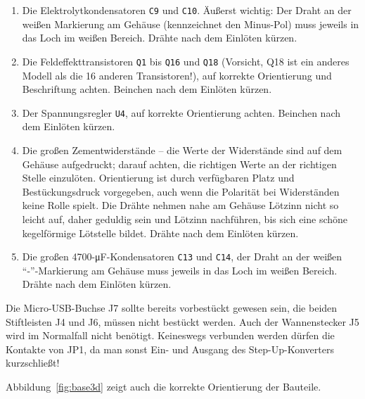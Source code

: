 \documentclass[paper=a4, open=any]{scrbook}
\begin{document}
\begin{enumerate}
					\item Die Elektrolytkondensatoren \texttt{C9} und \texttt{C10}. Äußerst wichtig: Der Draht an der weißen Markierung am Gehäuse (kennzeichnet den Minus-Pol) muss jeweils in das Loch im weißen Bereich. Drähte nach dem Einlöten kürzen.
					\item Die Feldeffekttransistoren \texttt{Q1} bis \texttt{Q16} und \texttt{Q18} (Vorsicht, Q18 ist ein anderes Modell als die 16 anderen Transistoren!), auf korrekte Orientierung und Beschriftung achten. Beinchen nach dem Einlöten kürzen.
					\item Der Spannungsregler \texttt{U4}, auf korrekte Orientierung achten. Beinchen nach dem Einlöten kürzen.
					\item Die großen Zementwiderstände -- die Werte der Widerstände sind auf dem Gehäuse aufgedruckt; darauf achten, die richtigen Werte an der richtigen Stelle einzulöten. Orientierung ist durch verfügbaren Platz und Bestückungsdruck vorgegeben, auch wenn die Polarität bei Widerständen keine Rolle spielt. Die Drähte nehmen nahe am Gehäuse Lötzinn nicht so leicht auf, daher geduldig sein und Lötzinn nachführen, bis sich eine schöne kegelförmige Lötstelle bildet. Drähte nach dem Einlöten kürzen.
					\item Die großen 4700-\si{\micro\farad}-Kondensatoren \texttt{C13} und \texttt{C14}, der Draht an der weißen \enquote{-}-Markierung am Gehäuse muss jeweils in das Loch im weißen Bereich. Drähte nach dem Einlöten kürzen.
				\end{enumerate}

				Die Micro-USB-Buchse J7 sollte bereits vorbestückt gewesen sein, die beiden Stiftleisten J4 und J6, müssen nicht bestückt werden. Auch der Wannenstecker J5 wird im Normalfall nicht benötigt. Keineswegs verbunden werden dürfen die Kontakte von JP1, da man sonst Ein- und Ausgang des Step-Up-Konverters kurzschließt!

				Abbildung~\ref{fig:base3d} zeigt auch die korrekte Orientierung der Bauteile.
\end{document}
